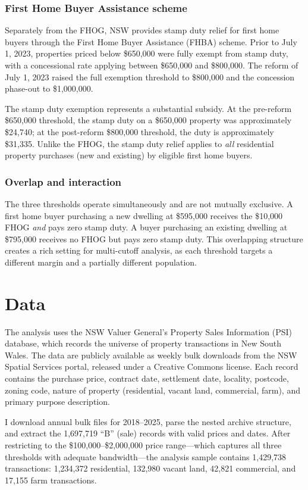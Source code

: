 \documentclass[12pt]{article}
\begin{document}
\subsubsection*{First Home Buyer Assistance scheme} Separately from the FHOG, NSW provides stamp duty relief for first home buyers through the First Home Buyer Assistance (FHBA) scheme. Prior to July 1, 2023, properties priced below \$650,000 were fully exempt from stamp duty, with a concessional rate applying between \$650,000 and \$800,000. The reform of July 1, 2023 raised the full exemption threshold to \$800,000 and the concession phase-out to \$1,000,000.

The stamp duty exemption represents a substantial subsidy. At the pre-reform \$650,000 threshold, the stamp duty on a \$650,000 property was approximately \$24,740; at the post-reform \$800,000 threshold, the duty is approximately \$31,335. Unlike the FHOG, the stamp duty relief applies to \textit{all} residential property purchases (new and existing) by eligible first home buyers.

\subsubsection*{Overlap and interaction} The three thresholds operate simultaneously and are not mutually exclusive. A first home buyer purchasing a new dwelling at \$595,000 receives the \$10,000 FHOG \textit{and} pays zero stamp duty. A buyer purchasing an existing dwelling at \$795,000 receives no FHOG but pays zero stamp duty. This overlapping structure creates a rich setting for multi-cutoff analysis, as each threshold targets a different margin and a partially different population.


\section{Data}

The analysis uses the NSW Valuer General's Property Sales Information (PSI) database, which records the universe of property transactions in New South Wales. The data are publicly available as weekly bulk downloads from the NSW Spatial Services portal, released under a Creative Commons license. Each record contains the purchase price, contract date, settlement date, locality, postcode, zoning code, nature of property (residential, vacant land, commercial, farm), and primary purpose description.

I download annual bulk files for 2018--2025, parse the nested archive structure, and extract the 1,697,719 ``B'' (sale) records with valid prices and dates. After restricting to the \$100,000--\$2,000,000 price range---which captures all three thresholds with adequate bandwidth---the analysis sample contains 1,429,738 transactions: 1,234,372 residential, 132,980 vacant land, 42,821 commercial, and 17,155 farm transactions.
\end{document}
